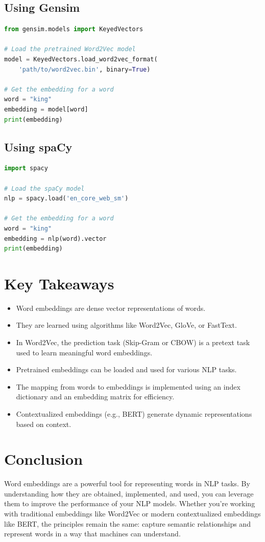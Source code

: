 \begin{notechapter}
\subsection{Using Gensim}
\begin{lstlisting}[language=Python]
from gensim.models import KeyedVectors

# Load the pretrained Word2Vec model
model = KeyedVectors.load_word2vec_format(
    'path/to/word2vec.bin', binary=True)

# Get the embedding for a word
word = "king"
embedding = model[word]
print(embedding)
\end{lstlisting}

\subsection{Using spaCy}
\begin{lstlisting}[language=Python]
import spacy

# Load the spaCy model
nlp = spacy.load('en_core_web_sm')

# Get the embedding for a word
word = "king"
embedding = nlp(word).vector
print(embedding)
\end{lstlisting}

\section{Key Takeaways}
\begin{itemize}
    \item Word embeddings are dense vector representations of 
    words.
    \item They are learned using algorithms like Word2Vec, GloVe, 
    or FastText.
    \item In Word2Vec, the prediction task (Skip-Gram or CBOW) is a 
    pretext task used to learn meaningful word embeddings.
    \item Pretrained embeddings can be loaded and used for various 
    NLP tasks.
    \item The mapping from words to embeddings is implemented 
    using an index dictionary and an embedding matrix for 
    efficiency.
    \item Contextualized embeddings (e.g., BERT) generate dynamic 
    representations based on context.
\end{itemize}

\section{Conclusion}
Word embeddings are a powerful tool for representing words in NLP 
tasks. By understanding how they are obtained, implemented, and 
used, you can leverage them to improve the performance of your NLP 
models. Whether you're working with traditional embeddings like 
Word2Vec or modern contextualized embeddings like BERT, the 
principles remain the same: capture semantic relationships and 
represent words in a way that machines can understand.
\end{notechapter}
